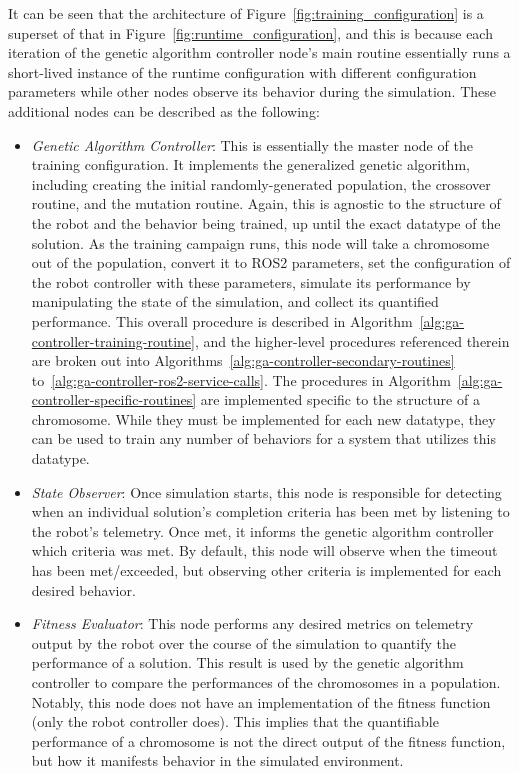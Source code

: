 \documentclass[conference]{IEEEtran}
\begin{document}
	It can be seen that the architecture of Figure~\ref{fig:training_configuration} is a superset of that in Figure~\ref{fig:runtime_configuration}, and this is because each iteration of the genetic algorithm controller node's main routine essentially runs a short-lived instance of the runtime configuration with different configuration parameters while other nodes observe its behavior during the simulation. These additional nodes can be described as the following:
	\begin{itemize}
		\item \textit{Genetic Algorithm Controller}: This is essentially the master node of the training configuration. It implements the generalized genetic algorithm, including creating the initial randomly-generated population, the crossover routine, and the mutation routine. Again, this is agnostic to the structure of the robot and the behavior being trained, up until the exact datatype of the solution. As the training campaign runs, this node will take a chromosome out of the population, convert it to ROS2 parameters, set the configuration of the robot controller with these parameters, simulate its performance by manipulating the state of the simulation, and collect its quantified performance. This overall procedure is described in Algorithm~\ref{alg:ga-controller-training-routine}, and the higher-level procedures referenced therein are broken out into Algorithms~\ref{alg:ga-controller-secondary-routines} to~\ref{alg:ga-controller-ros2-service-calls}. The procedures in Algorithm~\ref{alg:ga-controller-specific-routines} are implemented specific to the structure of a chromosome. While they must be implemented for each new datatype, they can be used to train any number of behaviors for a system that utilizes this datatype.
		\item \textit{State Observer}: Once simulation starts, this node is responsible for detecting when an individual solution's completion criteria has been met by listening to the robot's telemetry. Once met, it informs the genetic algorithm controller which criteria was met. By default, this node will observe when the timeout has been met/exceeded, but observing other criteria is implemented for each desired behavior.
		\item \textit{Fitness Evaluator}: This node performs any desired metrics on telemetry output by the robot over the course of the simulation to quantify the performance of a solution. This result is used by the genetic algorithm controller to compare the performances of the chromosomes in a population. Notably, this node does not have an implementation of the fitness function (only the robot controller does). This implies that the quantifiable performance of a chromosome is not the direct output of the fitness function, but how it manifests behavior in the simulated environment.

\end{itemize}
\end{document}
